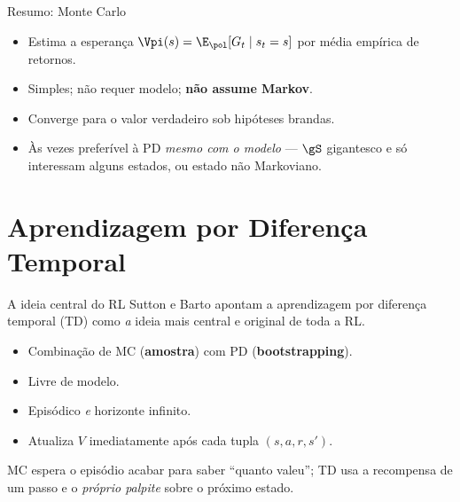\documentclass[aspectratio=169, 11pt]{beamer}
\begin{document}
\begin{frame}{Resumo: Monte Carlo}
  \begin{itemize}
    \item Estima a esperança $\Vpi(s) = \E_{\pol}[G_t \mid s_t = s]$
      por média empírica de retornos.
    \item Simples; não requer modelo; \textbf{não assume Markov}.
    \item Converge para o valor verdadeiro sob hipóteses brandas.
    \item Às vezes preferível à PD \emph{mesmo com o modelo} — $\gS$
      gigantesco e só interessam alguns estados, ou estado não Markoviano.
  \end{itemize}
\end{frame}

\section{Aprendizagem por Diferença Temporal}

\begin{frame}{A ideia central do RL}
  Sutton e Barto apontam a aprendizagem por diferença temporal (TD) como
  \emph{a} ideia mais central e original de toda a RL.

  \medskip
  \begin{itemize}
    \item Combinação de MC (\textbf{amostra}) com PD (\textbf{bootstrapping}).
    \item Livre de modelo.
    \item Episódico \emph{e} horizonte infinito.
    \item Atualiza $V$ \alert{imediatamente} após cada tupla $(s, a, r, s')$.
  \end{itemize}

  \begin{ideiabox}
    MC espera o episódio acabar para saber ``quanto valeu''; TD usa a
    recompensa de um passo e o \emph{próprio palpite} sobre o próximo estado.
  \end{ideiabox}
\end{frame}
\end{document}
